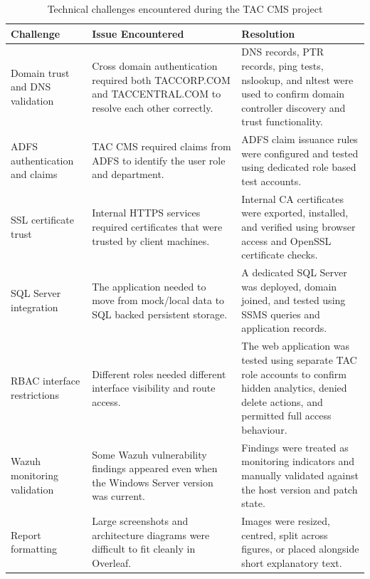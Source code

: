 \begin{table}[H]
\centering
\small
\renewcommand{\arraystretch}{1.25}
\begin{tabular}{|>{\raggedright\arraybackslash}p{4cm}|>{\raggedright\arraybackslash}p{5cm}|>{\raggedright\arraybackslash}p{5cm}|}
\hline
\textbf{Challenge} & \textbf{Issue Encountered} & \textbf{Resolution} \\
\hline
Domain trust and DNS validation & Cross domain authentication required both TACCORP.COM and TACCENTRAL.COM to resolve each other correctly. & DNS records, PTR records, ping tests, nslookup, and nltest were used to confirm domain controller discovery and trust functionality. \\
\hline
ADFS authentication and claims & TAC CMS required claims from ADFS to identify the user role and department. & ADFS claim issuance rules were configured and tested using dedicated role based test accounts. \\
\hline
SSL certificate trust & Internal HTTPS services required certificates that were trusted by client machines. & Internal CA certificates were exported, installed, and verified using browser access and OpenSSL certificate checks. \\
\hline
SQL Server integration & The application needed to move from mock/local data to SQL backed persistent storage. & A dedicated SQL Server was deployed, domain joined, and tested using SSMS queries and application records. \\
\hline
RBAC interface restrictions & Different roles needed different interface visibility and route access. & The web application was tested using separate TAC role accounts to confirm hidden analytics, denied delete actions, and permitted full access behaviour. \\
\hline
Wazuh monitoring validation & Some Wazuh vulnerability findings appeared even when the Windows Server version was current. & Findings were treated as monitoring indicators and manually validated against the host version and patch state. \\
\hline
Report formatting & Large screenshots and architecture diagrams were difficult to fit cleanly in Overleaf. & Images were resized, centred, split across figures, or placed alongside short explanatory text. \\
\hline
\end{tabular}
\caption{Technical challenges encountered during the TAC CMS project}
\label{tab:technical-challenges}
\end{table}
